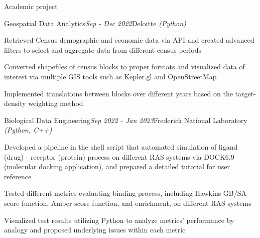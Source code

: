 \documentclass{resume} %
\begin{document}
	
\begin{rSection}{Academic project} 
	\begin{rSubsection}{Geospatial Data Analytics}{\em Sep - Dec 2022}{Deloitte \emph{(Python)}}{}
		\item Retrieved Census demographic and economic data via API and created advanced filters to select and aggregate data from different census periods 		
		\item Converted shapefiles of census blocks to proper formats and visualized data of interest via multiple GIS tools such as Kepler.gl and OpenStreetMap
		\item Implemented translations between blocks over different years based on the target-density weighting method
	\end{rSubsection}
	

	
	\begin{rSubsection}{Biological Data Engineering}{\em Sep 2022 - Jan 2023}{Frederick National Laboratory \emph{(Python, C++)}}{}
		\item Developed a pipeline in the shell script that automated simulation of ligand (drug) - receptor (protein) process on different RAS systems via DOCK6.9 (molecular docking application), and prepared a detailed tutorial for user reference
		\item Tested different metrics evaluating binding process, including Hawkins GB/SA score function, Amber score function, and enrichment, on different RAS systems
		\item Visualized test results utilizing Python to analyze metrics’ performance by analogy and proposed underlying issues within each metric
	\end{rSubsection}

\end{rSection}
	
\end{document}
